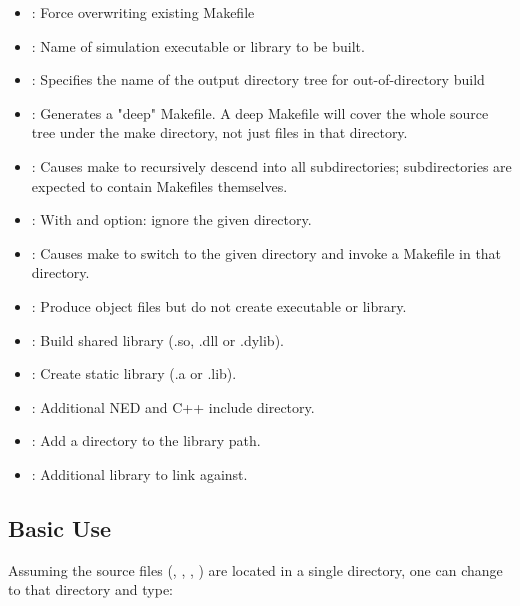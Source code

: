 \begin{itemize}
    \item{ : Force overwriting existing Makefile}
    \item{ : Name of simulation executable or library to be built.}
    \item{ : Specifies the name of the output directory tree
                          for out-of-directory build}
    \item{ : Generates a "deep" Makefile. A deep Makefile will
                          cover the whole source tree under the make directory,
                          not just files in that directory.}
    \item{ : Causes make to recursively descend into all subdirectories;
                          subdirectories are expected to contain Makefiles themselves.}
    \item{ :
                          With  and  option: ignore the given directory.}
    \item{ :
                          Causes make to switch to the given directory and invoke
                          a Makefile in that directory.}
    \item{ :  Produce object files but do not create executable or
                          library.}
    \item{ : Build shared library (.so, .dll or .dylib).}
    \item{ : Create static library (.a or .lib).}
    \item{ :   Additional NED and C++ include directory.}
    \item{ :   Add a directory to the library path.}
    \item{ : Additional library to link against.}
\end{itemize}


\subsection{Basic Use}
\label{sec:build-sim-progs:makemake-basic-use}

Assuming the source files (, , , )
are located in a single directory, one can change to that directory and type:

